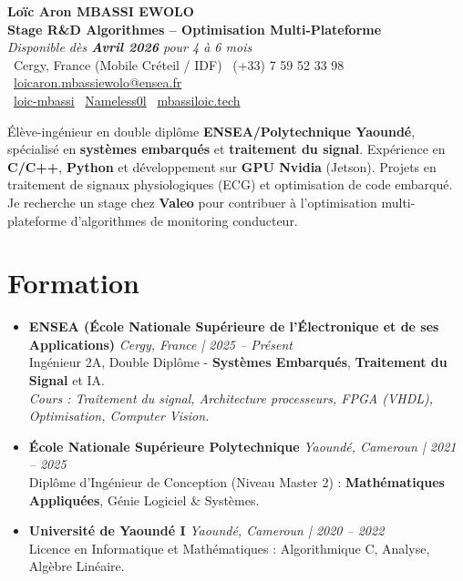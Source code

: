 \documentclass[a4paper,11pt]{article}
\begin{document}
\begin{center}
    {\Large \textbf{Loïc Aron MBASSI EWOLO}} \\ \vspace{4pt}
    \textbf{\large Stage R\&D Algorithmes -- Optimisation Multi-Plateforme} \\
    \textit{\small Disponible dès \textbf{Avril 2026} pour 4 à 6 mois}\\
    \vspace{4pt}
    \small
    \faMapMarker\ Cergy, France (Mobile Créteil / IDF) \quad
    \faPhone\ (+33) 7 59 52 33 98 \quad
    \faEnvelope\ \href{mailto:loicaron.mbassiewolo@ensea.fr}{loicaron.mbassiewolo@ensea.fr} \\ \vspace{2pt}
    \faLinkedin\ \href{https://www.linkedin.com/in/loic-mbassi}{loic-mbassi} \quad
    \faGithub\ \href{https://github.com/Nameless0l}{Nameless0l} \quad
    \faGlobe\ \href{https://mbassiloic.tech}{mbassiloic.tech}
\end{center}

\vspace{-6pt}

\noindent\small{Élève-ingénieur en double diplôme \textbf{ENSEA/Polytechnique Yaoundé}, spécialisé en \textbf{systèmes embarqués} et \textbf{traitement du signal}. Expérience en \textbf{C/C++}, \textbf{Python} et développement sur \textbf{GPU Nvidia} (Jetson). Projets en traitement de signaux physiologiques (ECG) et optimisation de code embarqué. Je recherche un stage chez \textbf{Valeo} pour contribuer à l'optimisation multi-plateforme d'algorithmes de monitoring conducteur.}

\section{Formation}
\begin{itemize}[leftmargin=*, label={.}, nosep]
    \item \textbf{ENSEA (École Nationale Supérieure de l'Électronique et de ses Applications)} \hfill \textit{Cergy, France | 2025 -- Présent} \\
    \small{Ingénieur 2A, Double Diplôme - \textbf{Systèmes Embarqués}, \textbf{Traitement du Signal} et IA.} \\
    \textit{\small{Cours : Traitement du signal, Architecture processeurs, FPGA (VHDL), Optimisation, Computer Vision.}}
    \vspace{2pt}
    \item \textbf{École Nationale Supérieure Polytechnique} \hfill \textit{Yaoundé, Cameroun | 2021 -- 2025} \\
    \small{Diplôme d'Ingénieur de Conception (Niveau Master 2) : \textbf{Mathématiques Appliquées}, Génie Logiciel \& Systèmes.}
    \item \textbf{Université de Yaoundé I} \hfill \textit{Yaoundé, Cameroun | 2020 -- 2022} \\
    \small{Licence en Informatique et Mathématiques : Algorithmique C, Analyse, Algèbre Linéaire.}
\end{itemize}
\end{document}
